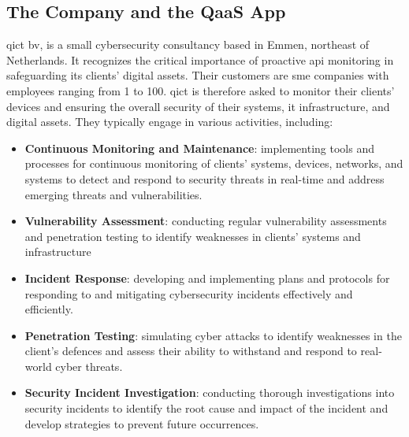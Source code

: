\begin{multicols}{2}
      \section{The Company and the QaaS App}
      \acrshort{qict} \acrshort{bv}, is a small cybersecurity consultancy based in Emmen, northeast of Netherlands.
      It recognizes the critical importance of proactive \acrshort{api} monitoring in safeguarding its clients' digital
      assets. Their customers are \acrshort{sme} companies with employees ranging from 1 to 100. \acrshort{qict} is
      therefore asked to monitor their clients' devices and ensuring the overall security of their systems, \acrshort{it}
      infrastructure, and digital assets. They typically engage in various activities, including:
      \begin{itemize}
            \item \textbf{Continuous Monitoring and Maintenance}: implementing tools and processes for continuous monitoring of
                  clients' systems, devices, networks, and systems to detect and respond to security threats in
                  real-time and address emerging threats and vulnerabilities.
            \item \textbf{Vulnerability Assessment}: conducting regular vulnerability assessments and penetration
                  testing to identify weaknesses in clients' systems and infrastructure
            \item \textbf{Incident Response}: developing and implementing plans and protocols for responding to
                  and mitigating cybersecurity incidents effectively and efficiently.
            \item \textbf{Penetration Testing}: simulating cyber attacks to identify weaknesses in the client's defences and
                  assess their ability to withstand and respond to real-world cyber threats.
            \item \textbf{Security Incident Investigation}: conducting thorough investigations into security incidents to
                  identify the root cause and impact of the incident and develop strategies to prevent future occurrences.
      \end{itemize}

\end{multicols}
